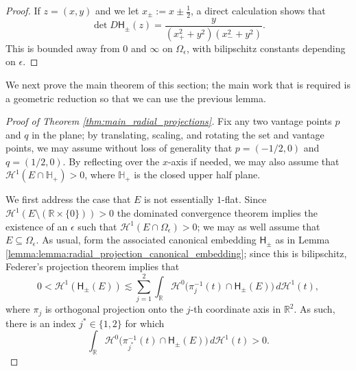 \documentclass[12pt]{amsart}
\theoremstyle{definition}
\numberwithin{equation}{section}
\begin{document}
\begin{proof}
    If $z = (x, y)$ and we let $x_{\pm} := x \pm \frac 1 2$, a direct calculation shows that
    $$\det D\mathsf{H}_{\pm}(z) = \frac{y}{(x_+^2 + y^2)(x_-^2 + y^2)}.$$
    This is bounded away from $0$ and $\infty$ on $\Omega_{\epsilon}$, with bilipschitz constants depending on $\epsilon$.
\end{proof}

We next prove the main theorem of this section; the main work that is required is a geometric reduction so that we can use the previous lemma. 

\begin{proof}[Proof of Theorem \ref{thm:main_radial_projections}]
Fix any two vantage points $p$ and $q$ in the plane; by translating, scaling, and rotating the set and vantage points, we may assume without loss of generality that $p = (-1/2, 0)$ and $q = (1/2, 0)$. By reflecting over the $x$-axis if needed, we may also assume that $\mathcal{H}^1(E \cap \mathbb{H}_+) > 0$, where $\mathbb{H}_+$ is the closed upper half plane. 

We first address the case that $E$ is not essentially $1$-flat. Since $\mathcal{H}^1(E \setminus (\mathbb{R} \times \{0\})) > 0$ the dominated convergence theorem implies the existence of an $\epsilon$ such that $\mathcal{H}^1(E \cap \Omega_{\epsilon}) > 0$; we may as well assume that $E \subseteq \Omega_{\epsilon}$. As usual, form the associated canonical embedding $\mathsf{H}_{\pm}$ as in Lemma \ref{lemma:lemma:radial_projection_canonical_embedding}; since this is bilipschitz, Federer's projection theorem implies that
$$0 < \mathcal{H}^1(\mathsf{H}_{\pm}(E)) \lesssim \sum_{j = 1}^2 \int_{\mathbb{R}} \mathcal{H}^0\big(\pi_j^{-1}(t) \cap \mathsf{H}_{\pm}(E)\big) \, d\mathcal{H}^1(t),$$
where $\pi_j$ is orthogonal projection onto the $j$-th coordinate axis in $\mathbb{R}^2$. As such, there is an index $j^* \in \{1, 2\}$ for which 
$$\int_{\mathbb{R}}  \mathcal{H}^0\big(\pi_{j^*}^{-1}(t) \cap \mathsf{H}_{\pm}(E)\big) \, d\mathcal{H}^1(t) > 0.$$


\end{proof}
\end{document}

